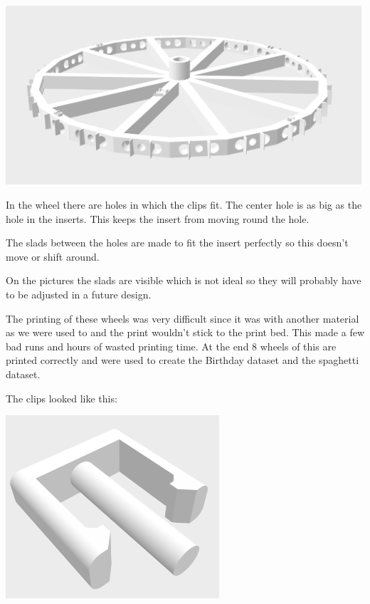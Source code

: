 \documentclass{article}
\begin{document}
\includegraphics[width=5.208333in, keepaspectratio=true]{./ZimFiles_files/Camera_setup/Tool_Holder/Wheel_Holder/Second_Wheel_Holder/radhouder_v2.png}



In the wheel there are holes in which the clips fit. The center hole is as big as the hole in the inserts. This keeps the insert from moving round the hole.

The slads between the holes are made to fit the insert perfectly so this doesn't move or shift around. 



On the pictures the slads are visible which is not ideal so they will probably have to be adjusted in a future design.



The printing of these wheels was very difficult since it was with another material as we were used to and the print wouldn't stick to the print bed. This made a few bad runs and hours of wasted printing time. At the end 8 wheels of this are printed correctly and were used to create the Birthday dataset and the spaghetti dataset.



The clips looked like this:

\includegraphics[width=3.125000in, keepaspectratio=true]{./ZimFiles_files/Camera_setup/Tool_Holder/Wheel_Holder/Second_Wheel_Holder/clip_9.png}
\end{document}
